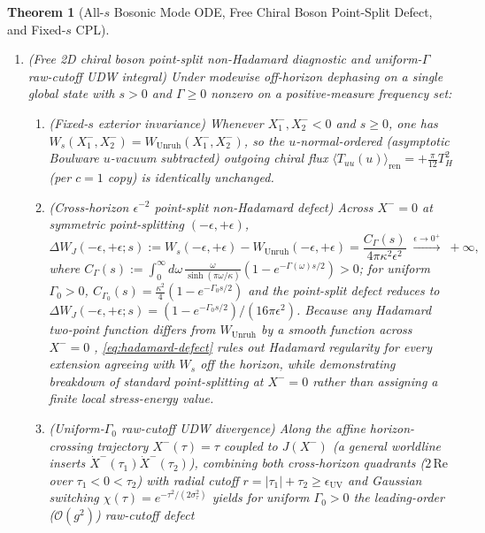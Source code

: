 \documentclass[11pt,a4paper]{article}
\newtheorem{theorem}{Theorem}
\theoremstyle{definition}
\theoremstyle{remark}
\newcommand{\1}{\mathbf{1}}
\begin{document}
\begin{theorem}[All-$s$ Bosonic Mode ODE, Free Chiral Boson Point-Split Defect, and Fixed-$s$ CPL]
\begin{enumerate}
  \item[(b)] \emph{(Free 2D chiral boson point-split non-Hadamard diagnostic and uniform-$\Gamma$ raw-cutoff UDW integral)} Under modewise off-horizon dephasing on a single global state with $s>0$ and $\Gamma\ge 0$ nonzero on a positive-measure frequency set:
  \begin{enumerate}
    \item[(i)] \emph{(Fixed-$s$ exterior invariance)} Whenever $X_1^-, X_2^- < 0$ and $s\ge 0$, one has $W_s(X_1^-, X_2^-) = W_{\mathrm{Unruh}}(X_1^-, X_2^-)$, so the $u$-normal-ordered (asymptotic Boulware $u$-vacuum subtracted) outgoing chiral flux $\langle T_{uu}(u)\rangle_{\mathrm{ren}} = +\frac{\pi}{12}T_H^2$ (per $c=1$ copy) is identically unchanged.
    \item[(ii)] \emph{(Cross-horizon $\epsilon^{-2}$ point-split non-Hadamard defect)} Across $X^-=0$ at symmetric point-splitting $(-\epsilon,+\epsilon)$,
    \begin{equation}\label{eq:hadamard-defect}
      \Delta W_J(-\epsilon, +\epsilon; s) := W_s(-\epsilon, +\epsilon) - W_{\mathrm{Unruh}}(-\epsilon, +\epsilon)
      = \frac{C_\Gamma(s)}{4\pi \kappa^2 \epsilon^2} \;\xrightarrow{\epsilon\to 0^+}\; +\infty,
    \end{equation}
    where $C_\Gamma(s) := \int_0^\infty d\omega\,\frac{\omega}{\sinh(\pi\omega/\kappa)}(1 - e^{-\Gamma(\omega)s/2}) > 0$; for uniform $\Gamma_0>0$, $C_{\Gamma_0}(s)=\frac{\kappa^2}{4}(1-e^{-\Gamma_0 s/2})$ and the point-split defect reduces to $\Delta W_J(-\epsilon,+\epsilon;s)=(1-e^{-\Gamma_0 s/2})/(16\pi\epsilon^2)$. Because any Hadamard two-point function differs from $W_{\mathrm{Unruh}}$ by a smooth function across $X^-=0$ \cite{Radzikowski1996,Sanders2015}, \eqref{eq:hadamard-defect} rules out Hadamard regularity for every extension agreeing with $W_s$ off the horizon, while demonstrating breakdown of standard point-splitting at $X^-=0$ rather than assigning a finite local stress-energy value.
    \item[(iii)] \emph{(Uniform-$\Gamma_0$ raw-cutoff UDW divergence)} Along the affine horizon-crossing trajectory $X^-(\tau) = \tau$ coupled to $J(X^-)$ (a general worldline inserts $\dot{X}^-(\tau_1)\dot{X}^-(\tau_2)$), combining both cross-horizon quadrants ($2\,\mathrm{Re}$ over $\tau_1<0<\tau_2$) with radial cutoff $r=|\tau_1|+\tau_2 \ge \epsilon_{\mathrm{UV}}$ and Gaussian switching $\chi(\tau) = e^{-\tau^2/(2\sigma_\tau^2)}$ yields for uniform $\Gamma_0>0$ the leading-order ($\mathcal{O}(g^2)$) raw-cutoff defect
    \begin{equation}\label{eq:udw-div}

\end{equation}
\end{enumerate}
\end{enumerate}
\end{theorem}
\end{document}
